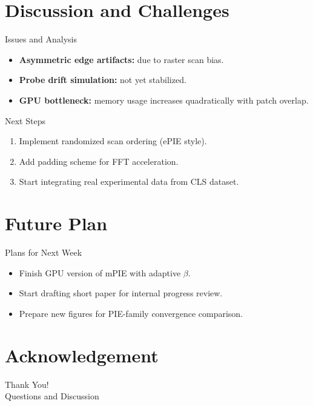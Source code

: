 \documentclass[15pt]{beamer}
\begin{document}
\section{Discussion and Challenges}
\begin{frame}{Issues and Analysis}
\footnotesize
\begin{itemize}
  \item \textbf{Asymmetric edge artifacts:} due to raster scan bias.
  \item \textbf{Probe drift simulation:} not yet stabilized.
  \item \textbf{GPU bottleneck:} memory usage increases quadratically with patch overlap.
\end{itemize}

\vspace{3mm}
\begin{block}{Next Steps}
\begin{enumerate}
  \item Implement randomized scan ordering (ePIE style).
  \item Add padding scheme for FFT acceleration.
  \item Start integrating real experimental data from CLS dataset.
\end{enumerate}
\end{block}
\end{frame}

\section{Future Plan}
\begin{frame}{Plans for Next Week}
\footnotesize
\begin{itemize}
  \item [\ding{43}] Finish GPU version of mPIE with adaptive $\beta$.
  \item [\ding{43}] Start drafting short paper for internal progress review.
  \item [\ding{43}] Prepare new figures for PIE-family convergence comparison.
\end{itemize}


\end{frame}

\section*{Acknowledgement}
\begin{frame}[plain]
\centering
\vspace{1cm}
\Huge Thank You!\\[3mm]
\large Questions and Discussion
\end{frame}
\end{document}
